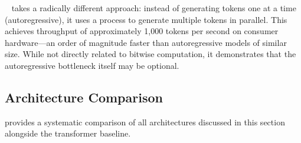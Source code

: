 ~\cite{inception2025mercury} takes a radically
different approach: instead of generating tokens one at a time
(autoregressive), it uses a  process to generate
multiple tokens in parallel. This achieves throughput of
approximately 1{,}000 tokens per second on consumer hardware---an
order of magnitude faster than autoregressive models of similar size.
While not directly related to bitwise computation, it demonstrates
that the autoregressive bottleneck itself may be optional.

\subsection{Architecture Comparison}
\label{sec:alt-arch-comparison}

 provides a systematic comparison of all
architectures discussed in this section alongside the transformer
baseline.

